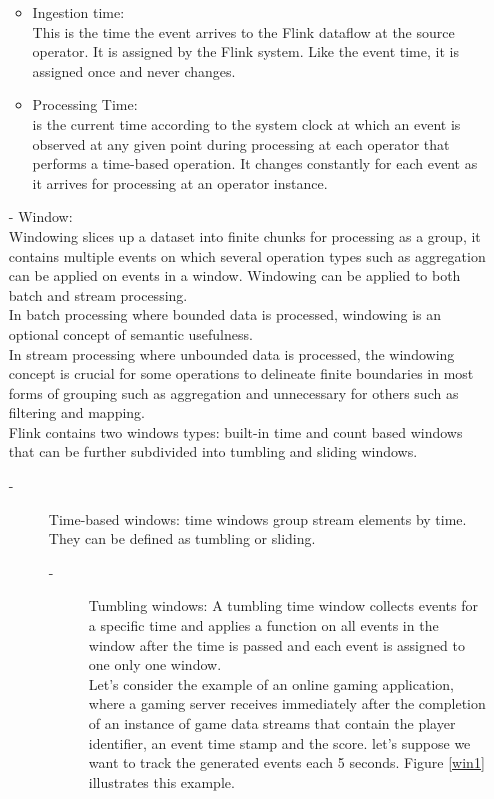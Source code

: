 \begin{itemize}
\begin{itemize}
\item 	Ingestion time:\\ 
This is the time the event arrives to the Flink dataflow at the source operator. It is assigned by the Flink system.  Like the event time, it is assigned once and never changes. 

\item	Processing Time:\\
  is the current time according to the system clock at which an event is observed at any given point during processing at each operator that performs a time-based operation. It changes constantly for each event as it arrives for processing at an operator instance.
\end{itemize}

 \item[-] Window: \\
Windowing slices up a dataset into finite chunks for processing as a group, it contains multiple events on which several operation types such as aggregation can be applied on events in a window. Windowing can be applied to both batch and stream processing.\\
In batch processing where bounded data is processed, windowing is an optional concept of semantic usefulness. \\
In stream processing where unbounded data is processed, the windowing concept is crucial for some operations to delineate finite boundaries in most forms of grouping such as aggregation and unnecessary for others such as filtering and mapping.\\
Flink contains two windows types: built-in time and count based windows that can be further subdivided into 
tumbling and sliding windows.
\begin{description}
\item[-] Time-based windows: time windows group stream elements by time. They can be defined as tumbling or sliding. 
\begin{description}
\item[-] Tumbling windows: A tumbling time window collects events for a specific time and applies a function on all events in the window after the time is passed and each event is assigned to one only one window. \\
Let's consider the example of an online gaming application, where a gaming server receives immediately after the completion of an instance of game data streams that contain the player identifier, an event time stamp and the score. let's suppose we want to track the generated events each 5 seconds. Figure \ref{win1} illustrates this example.


\end{description}
\end{description}
\end{itemize}
